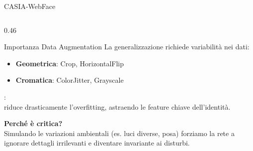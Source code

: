 \documentclass[aspectratio=169, 10pt]{beamer}
\begin{document}
\begin{frame}{CASIA-WebFace}
\begin{columns}[T, onlytextwidth]
\begin{column}{0.46\textwidth}
    \begin{alertblock}{\warn{[!]} Importanza Data Augmentation}
        \small
        La generalizzazione richiede variabilità nei dati:
        \begin{itemize}
            \item \textbf{Geometrica}: Crop, HorizontalFlip
            \item \textbf{Cromatica}: ColorJitter, Grayscale
        \end{itemize}
        \medskip
        :\\
        riduce drasticamente l'overfitting, astraendo le
        feature chiave dell'identità.
    \end{alertblock}

    \medskip
    {\small\textbf{Perché è critica?}\\[0.2em]
    Simulando le variazioni ambientali (es. luci diverse,
    posa) forziamo la rete a ignorare dettagli irrilevanti
    e diventare invariante ai disturbi.}
\end{column}

\end{columns}
\end{frame}
\end{document}
